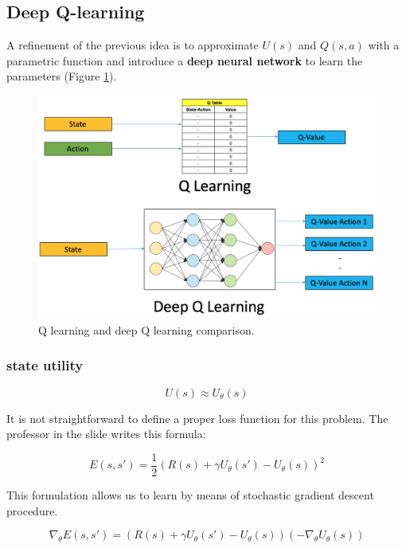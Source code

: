 \subsection{Deep Q-learning}
A refinement of the previous idea is to approximate $U(s)$ and $Q(s,a)$ with a
parametric function and introduce a \textbf{deep neural network} to learn the parameters
(Figure \ref{fig:reinforcementLearningDeep}).

\begin{figure}[H]
	\centering
	\includegraphics[width=\textwidth]{
		images/19_ReinforcementLearning_deepQLearning.png
	}
	\caption{Q learning and deep Q learning comparison.}
	\label{fig:reinforcementLearningDeep}
\end{figure}

\subsubsection{state utility}
\begin{equation}
	U(s) \approx U_{\theta}(s)
\end{equation}

It is not straightforward to define a proper loss function for this problem. The
professor in the slide writes this formula:

\begin{equation}
	E(s,s') = \frac{1}{2}(R(s) + \gamma U_{\theta}(s') - U_{\theta}(s))^{2}
\end{equation}

This formulation allows us to learn by means of stochastic gradient descent procedure.

\begin{equation}
	\nabla_{\theta}E(s,s') = (R(s) + \gamma U_{\theta}(s') - U_{\theta}(s)) (- \nabla
	_{\theta}U_{\theta}(s))
\end{equation}

